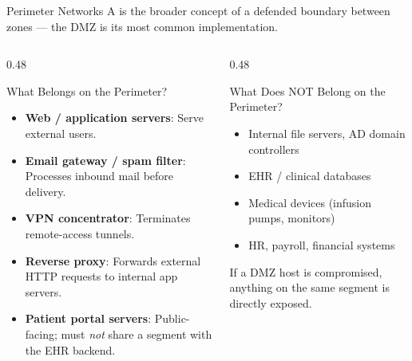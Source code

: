 \documentclass[aspectratio=169]{beamer}  %
\begin{document}
\begin{frame}{Perimeter Networks}
    \footnotesize
    A  is the broader concept of a defended boundary between zones --- the DMZ is its most common implementation.

    \vspace{0.3em}
    \begin{columns}[T]
        \begin{column}{0.48\textwidth}
            \begin{block}{What Belongs on the Perimeter?}
                \footnotesize
                \begin{itemize}
                    \item \textbf{Web / application servers}: Serve external users.
                    \item \textbf{Email gateway / spam filter}: Processes inbound mail before delivery.
                    \item \textbf{VPN concentrator}: Terminates remote-access tunnels.
                    \item \textbf{Reverse proxy}: Forwards external HTTP requests to internal app servers.
                    \item \textbf{Patient portal servers}: Public-facing; must \emph{not} share a segment with the EHR backend.
                \end{itemize}
            \end{block}
        \end{column}
        \begin{column}{0.48\textwidth}
            \begin{alertblock}{What Does NOT Belong on the Perimeter?}
                \footnotesize
                \begin{itemize}
                    \item Internal file servers, AD domain controllers
                    \item EHR / clinical databases
                    \item Medical devices (infusion pumps, monitors)
                    \item HR, payroll, financial systems
                \end{itemize}
                \vspace{0.2em}
                If a DMZ host is compromised, anything on the same segment is directly exposed.
            \end{alertblock}
        \end{column}
    \end{columns}
\end{frame}
\end{document}
